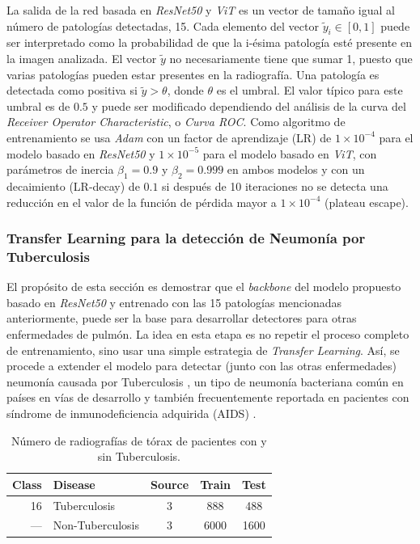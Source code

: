 La salida de la red basada en \textit{ResNet50} y \textit{ViT} es un vector de tamaño igual al número
de patologías detectadas, 15. Cada elemento del vector $\tilde y_i \in [0,1]$ puede ser interpretado
como la probabilidad de que la i-ésima patología esté presente en la imagen analizada. El vector
$\tilde y$ no necesariamente tiene que sumar 1, puesto que varias patologías pueden estar presentes
en la radiografía. Una patología es detectada como positiva si $\tilde y > \theta$, donde $\theta$ es
el umbral. El valor típico para este umbral es de $0.5$ y puede ser modificado dependiendo del análisis
de la curva del \textit{Receiver Operator Characteristic}, o \textit{Curva ROC}. Como algoritmo de
entrenamiento se usa \emph{Adam} \cite{kingma2017adam} con un factor de aprendizaje (LR) de
$1\times 10^{-4}$ para el modelo basado en \textit{ResNet50} y $1\times 10^{-5}$ para el modelo basado
en \textit{ViT}, con parámetros de inercia $\beta_1=0.9$ y $\beta_2=0.999$ en ambos modelos y con un
decaimiento (LR-decay) de $0.1$ si después de 10 iteraciones no se detecta una reducción en el valor
de la función de pérdida mayor a $1\times 10^{-4}$ (plateau escape).


\subsubsection{Transfer Learning para la detección de Neumonía por Tuberculosis}

El propósito de esta sección es demostrar que el \textit{backbone} del modelo propuesto basado en
\textit{ResNet50} y entrenado con las 15 patologías mencionadas anteriormente, puede ser la base para
desarrollar detectores para otras enfermedades de pulmón. La idea en esta etapa es no repetir el proceso
completo de entrenamiento, sino usar una simple estrategia de \textit{Transfer Learning}. Así, se procede
a extender el modelo para detectar (junto con las otras enfermedades) neumonía causada por Tuberculosis
\cite{stirenko2018chest}, un tipo de neumonía bacteriana común en países en vías de desarrollo y también
frecuentemente reportada en pacientes con síndrome de inmunodeficiencia adquirida (AIDS)
\cite{matsuura2018tuberculous}.


\begin{table}[!ht]
    \centering
    \begin{tabular}{| r |l | c | c | c |}
     \hline
     Class & Disease & Source & Train & Test  \\
     \hline\hline
     16  & Tuberculosis        & 3 & 888   & 488  \\
     ---&  Non-Tuberculosis     & 3 & 6000  & 1600 \\
     \hline
    \end{tabular}
    \caption{ Número de radiografías de tórax de pacientes con y sin Tuberculosis.}
\label{table_dataset_tb}
\end{table}

